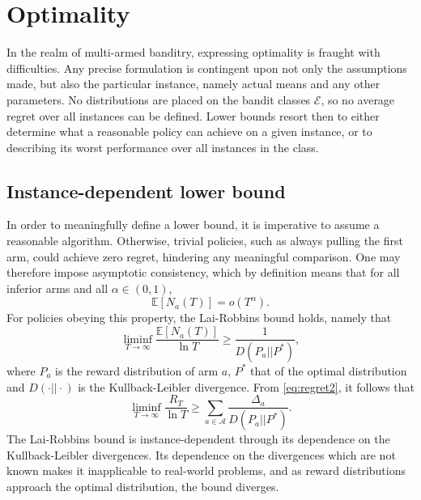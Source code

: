 \section{Optimality}
In the realm of multi-armed banditry, expressing optimality is fraught with difficulties.
Any precise formulation is contingent upon not only the assumptions made, but also the particular instance, namely actual means and any other parameters.
No distributions are placed on the bandit classes $\mathcal{E}$, so no average regret over all instances can be defined.
Lower bounds resort then to either determine what a reasonable policy can achieve on a given instance, or to describing its worst performance over all instances in the class.

\subsection{Instance-dependent lower bound}
In order to meaningfully define a lower bound, it is imperative to assume a reasonable algorithm.
Otherwise, trivial policies, such as always pulling the first arm, could achieve zero regret, hindering any meaningful comparison.
One may therefore impose asymptotic consistency, which by definition means that for all inferior arms and all $\alpha \in (0, 1)$,
\begin{equation}
    \mathbb{E}[N_a(T)] = o(T^{\alpha}).
\end{equation}
For policies obeying this property, the Lai-Robbins bound \cite{lai1985} holds, namely that
\begin{equation}
    \liminf_{T\to\infty} \frac{\mathbb{E}[N_a(T)]}{\ln T} \geq \frac{1}{D(P_a || P^*)},
\end{equation}
where $P_a$ is the reward distribution of arm $a$, $P^*$ that of the optimal distribution and $D(\cdot || \cdot)$ is the Kullback-Leibler divergence.
From \cref{eq:regret2}, it follows that
\begin{equation}
    \liminf_{T\to\infty} \frac{R_T}{\ln T} \geq \sum_{a \in \mathcal{A}}\frac{\Delta_a}{D(P_a || P^*)}.
\end{equation}
The Lai-Robbins bound is instance-dependent through its dependence on the Kullback-Leibler divergences.
Its dependence on the divergences which are not known makes it inapplicable to real-world problems, and as reward distributions approach the optimal distribution, the bound diverges.

